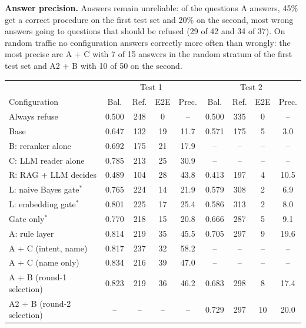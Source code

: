 \textbf{Answer precision.} Answers remain unreliable: of the questions A answers, 45\% get a correct procedure on the first test set and
20\% on the second, most wrong answers going to questions that should be refused (29 of 42 and 34 of 37). On random traffic no
configuration answers correctly more often than wrongly: the most precise are A + C with 7 of 15 answers in the random stratum of the first
test set and A2 + B with 10 of 50 on the second.

\begin{table}[h]
{\begin{tabular}{@{}lcccccccc@{}}\toprule
 & \multicolumn{4}{c}{Test 1} & \multicolumn{4}{c}{Test 2} \\
Configuration & Bal. & Ref. & E2E & Prec. & Bal. & Ref. & E2E & Prec. \\ \midrule
Always refuse & 0.500 & 248 & 0 & -- & 0.500 & 335 & 0 & -- \\
Base & 0.647 & 132 & 19 & 11.7 & 0.571 & 175 & 5 & 3.0 \\
B: reranker alone & 0.692 & 175 & 21 & 17.9 & -- & -- & -- & -- \\
C: LLM reader alone & 0.785 & 213 & 25 & 30.9 & -- & -- & -- & -- \\
R: RAG + LLM decides & 0.489 & 104 & 28 & 43.8 & 0.413 & 197 & 4 & 10.5 \\
L: naive Bayes gate$^*$ & 0.765 & 224 & 14 & 21.9 & 0.579 & 308 & 2 & 6.9 \\
L: embedding gate$^*$ & 0.801 & 225 & 17 & 25.4 & 0.586 & 313 & 2 & 8.0 \\
Gate only$^*$ & 0.770 & 218 & 15 & 20.8 & 0.666 & 287 & 5 & 9.1 \\
A: rule layer & 0.814 & 219 & 35 & 45.5 & 0.705 & 297 & 9 & 19.6 \\
A + C (intent, name) & 0.817 & 237 & 32 & 58.2 & -- & -- & -- & -- \\
A + C (name only) & 0.834 & 216 & 39 & 47.0 & -- & -- & -- & -- \\
A + B (round-1 selection) & 0.823 & 219 & 36 & 46.2 & 0.683 & 298 & 8 & 17.4 \\
A2 + B (round-2 selection) & -- & -- & -- & -- & 0.729 & 297 & 10 & 20.0 \\ \bottomrule
\end{tabular}}
\end{table}
